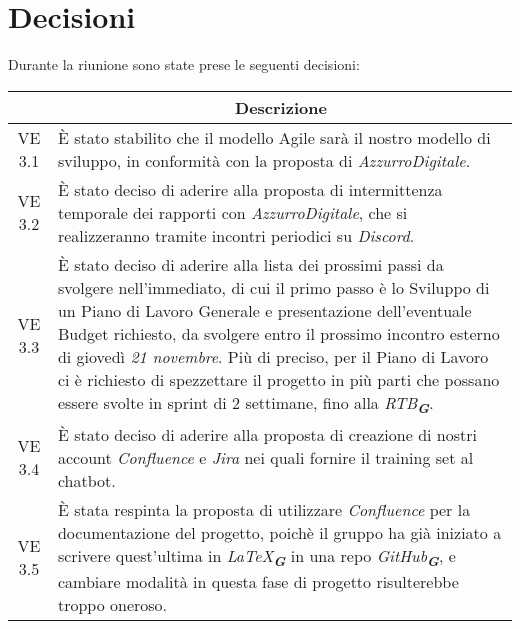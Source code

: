 

\section{Decisioni}

Durante la riunione sono state prese le seguenti decisioni:

\vspace{0.5cm}

\begin{table}[htbp]
    \centering
    \begin{tabular}{|c|p{}|}
        \hline
        \rowcolor[gray]{0.75}
        \multicolumn{1}{|c|}{\textbf{Codice}} & \multicolumn{1}{|c|}{\textbf{Descrizione}}\\
        \hline
        VE 3.1 & È stato stabilito che il modello Agile sarà il nostro modello di sviluppo, in conformità con la proposta di \emph{AzzurroDigitale}. \\
        \hline
        VE 3.2 & È stato deciso di aderire alla proposta di intermittenza temporale dei rapporti con \emph{AzzurroDigitale}, che si realizzeranno tramite incontri periodici 
        su \emph{Discord}. \\
        \hline
        VE 3.3 & È stato deciso di aderire alla lista dei prossimi passi da svolgere nell'immediato, di cui il primo passo è lo Sviluppo di un Piano di Lavoro
        Generale e presentazione dell'eventuale Budget richiesto, da svolgere entro il prossimo incontro esterno di giovedì \emph{21 novembre}. Più di
        preciso, per il Piano di Lavoro ci è richiesto di spezzettare il progetto in più parti che possano essere svolte in sprint di 2 settimane, fino alla
        \emph{RTB}\textsubscript{\textit{\textbf{G}}}. \\
        \hline
        VE 3.4 & È stato deciso di aderire alla proposta di creazione di nostri account \emph{Confluence} e \emph{Jira} nei quali fornire il training set 
        al chatbot. \\
        \hline
        VE 3.5 & È stata respinta la proposta di utilizzare \emph{Confluence} per la documentazione del progetto, poichè il gruppo ha già iniziato a scrivere
        quest'ultima in \emph{\LaTeX}\textsubscript{\textit{\textbf{G}}} in una repo \emph{GitHub}\textsubscript{\textit{\textbf{G}}}, e cambiare modalità in questa fase
        di progetto risulterebbe troppo oneroso. \\

\end{tabular}
\end{table}
